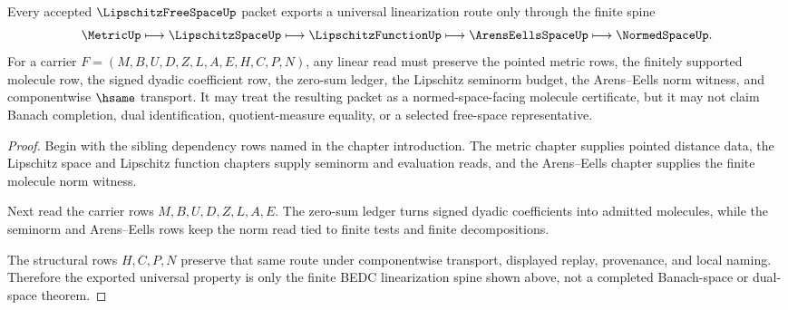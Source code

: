\begin{theorem}
\label{thm:lipschitz-free-space-universal-linearization}
Every accepted $\LipschitzFreeSpaceUp$ packet exports a universal linearization route only through the finite spine
$$
\MetricUp \longmapsto
\LipschitzSpaceUp \longmapsto
\LipschitzFunctionUp \longmapsto
\ArensEellsSpaceUp \longmapsto
\NormedSpaceUp .
$$
For a carrier $F=(M,B,U,D,Z,L,A,E,H,C,P,N)$, any linear read must preserve the pointed metric rows, the finitely supported molecule row, the signed dyadic coefficient row, the zero-sum ledger, the Lipschitz seminorm budget, the Arens--Eells norm witness, and componentwise $\hsame$ transport. It may treat the resulting packet as a normed-space-facing molecule certificate, but it may not claim Banach completion, dual identification, quotient-measure equality, or a selected free-space representative.
\end{theorem}
\begin{proof}
Begin with the sibling dependency rows named in the chapter introduction. The metric chapter supplies pointed distance data, the Lipschitz space and Lipschitz function chapters supply seminorm and evaluation reads, and the Arens--Eells chapter supplies the finite molecule norm witness.

Next read the carrier rows $M,B,U,D,Z,L,A,E$. The zero-sum ledger turns signed dyadic coefficients into admitted molecules, while the seminorm and Arens--Eells rows keep the norm read tied to finite tests and finite decompositions.

The structural rows $H,C,P,N$ preserve that same route under componentwise transport, displayed replay, provenance, and local naming. Therefore the exported universal property is only the finite BEDC linearization spine shown above, not a completed Banach-space or dual-space theorem.
\end{proof}



